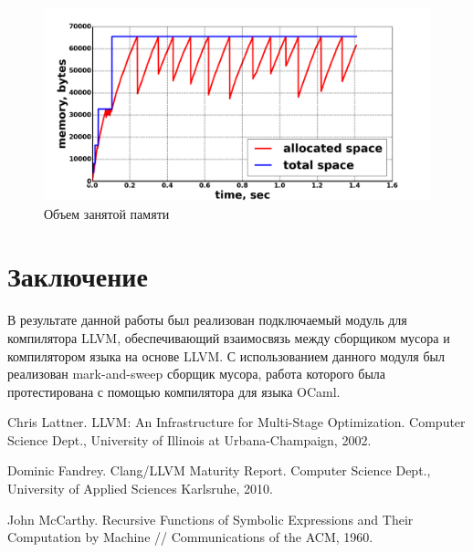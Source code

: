 \begin{figure}
\caption{\label{pic:memory-with-gc}Объем занятой памяти}
\includegraphics[width=1\linewidth]{Samofalov/parser-no-space.png}
\end{figure}
\section*{Заключение}
В результате данной работы был реализован подключаемый модуль для компилятора LLVM, обеспечивающий взаимосвязь между сборщиком мусора и компилятором языка на основе LLVM.  С использованием данного модуля был реализован mark-and-sweep сборщик мусора, работа которого была протестирована с помощью компилятора для языка OCaml. 

\begin{thebibliography}{99}
 Chris Lattner.
LLVM: An Infrastructure for Multi-Stage Optimization.
Computer Science Dept., University of Illinois at Urbana-Champaign, 2002.

Dominic Fandrey. Clang/LLVM Maturity Report.
Computer Science Dept., University of Applied Sciences Karlsruhe, 2010.

John McCarthy.
Recursive Functions of Symbolic Expressions and Their Computation by Machine //
Communications of the ACM, 1960.
\end{thebibliography}
